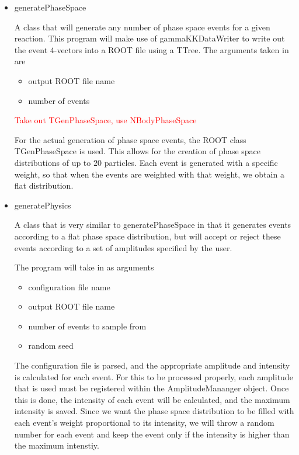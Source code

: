 \documentclass[11pt]{article}
\newcommand{\comment}[1]{\textcolor{red}{\ding{110}\ding{43} #1}}
\begin{document}
\begin{itemize}

  \item generatePhaseSpace

    A class that will generate any number of phase space
    events for a given reaction. This program will make use of
    gammaKKDataWriter to write out the event $4$-vectors into a ROOT
    file using a TTree. The arguments taken in are
    \begin{itemize}
      \item output ROOT file name
      \item number of events
    \end{itemize}

    \comment{Take out TGenPhaseSpace, use NBodyPhaseSpace}

    For the actual generation of phase space events, the ROOT class
    TGenPhaseSpace is used. This allows for the creation of phase
    space distributions of up to $20$ particles. Each event is
    generated with a specific weight, so that when the events are
    weighted with that weight, we obtain a flat distribution.

  \item generatePhysics

    A class that is very similar to generatePhaseSpace in that it
    generates events according to a flat phase space distribution, but
    will accept or reject these events according to a set of
    amplitudes specified by the user.

    The program will take in as arguments
    \begin{itemize}
      \item configuration file name
      \item output ROOT file name
      \item number of events to sample from
      \item random seed
    \end{itemize}
    The configuration file is parsed, and the appropriate amplitude
    and intensity is calculated for each event. For this to be
    processed properly, each amplitude that is used must be registered
    within the AmplitudeMananger object. Once this is done, the
    intensity of each event will be calculated, and the maximum
    intensity is saved. Since we want the phase space distribution to
    be filled with each event's weight proportional to its intensity,
    we will throw a random number for each event and keep the event
    only if the intensity is higher than the maximum intenstiy.


\end{itemize}
\end{document}
